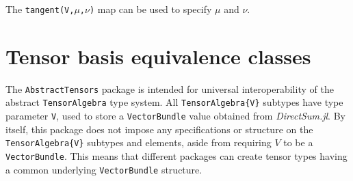 \documentclass{juliacon}
\begin{document}
The \verb`tangent(V,`$\mu$\verb`,`$\nu$\verb`)` map can be used to specify $\mu$ and $\nu$.

\section{Tensor basis equivalence classes}%

The \verb`AbstractTensors` package is intended for universal interoperability of the abstract \verb`TensorAlgebra` type system.
All \verb`TensorAlgebra{V}` subtypes have type parameter \verb`V`, used to store a \verb`VectorBundle` value obtained from \textit{DirectSum.jl}.
By itself, this package does not impose any specifications or structure on the \verb`TensorAlgebra{V}` subtypes and elements, aside from requiring $V$ to be a \verb`VectorBundle`.
This means that different packages can create tensor types having a common underlying \verb`VectorBundle` structure.
\end{document}
